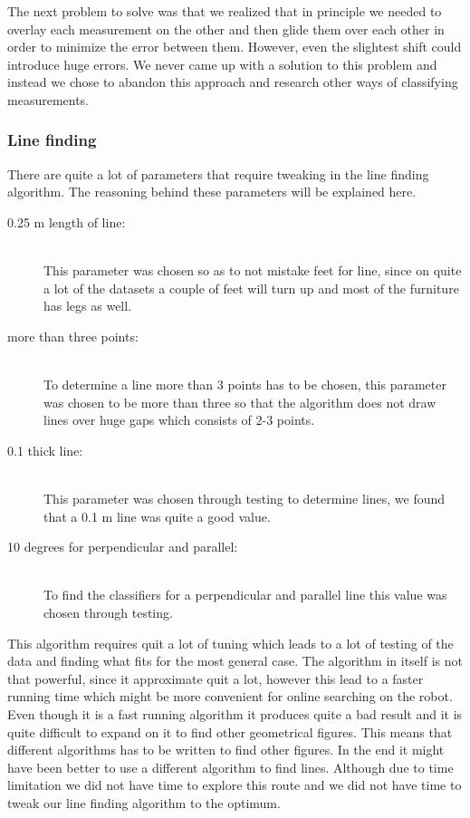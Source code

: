 \documentclass[a4paper, 10pt, conference]{ieeeconf}      %
\begin{document}
The next problem to solve was that we realized that in principle we needed to overlay each measurement on the other and then glide them over each other in order to minimize the error between them. However, even the slightest shift could introduce huge errors. We never came up with a solution to this problem and instead we chose to abandon this approach and research other ways of classifying measurements.

\subsubsection{Line finding}
There are quite a lot of parameters that require tweaking in the line finding algorithm. The reasoning behind these parameters will be explained here.

\begin{description}
\item[0.25 m length of line:] \hfill \\ This parameter was chosen so as to not mistake feet for line, since on quite a lot of the datasets a couple of feet will turn up and most of the furniture has legs as well.
\item[more than three points:] \hfill \\ To determine a line more than 3 points has to be chosen, this parameter was chosen to be more than three so that the algorithm does not draw lines over huge gaps which consists of 2-3 points.
\item[0.1 thick line:] \hfill \\ This parameter was chosen through testing to determine lines, we found that a 0.1 m line was quite a good value.
\item[10 degrees for perpendicular and parallel:] \hfill \\ To find the classifiers for a perpendicular and parallel line this value was chosen through testing. 
\end{description}

This algorithm requires quit a lot of tuning which leads to a lot of testing of the data and finding what fits for the most general case. The algorithm in itself is not that powerful, since it approximate quit a lot, however this lead to a faster running time which might be more convenient for online searching on the robot.
Even though it is a fast running algorithm it produces quite a bad result and it is quite difficult to expand on it to find other geometrical figures. This means that different algorithms has to be written to find other figures. In the end it might have been better to use a different algorithm to find lines. Although due to time limitation we did not have time to explore this route and we did not have time to tweak our line finding algorithm to the optimum.
\end{document}
